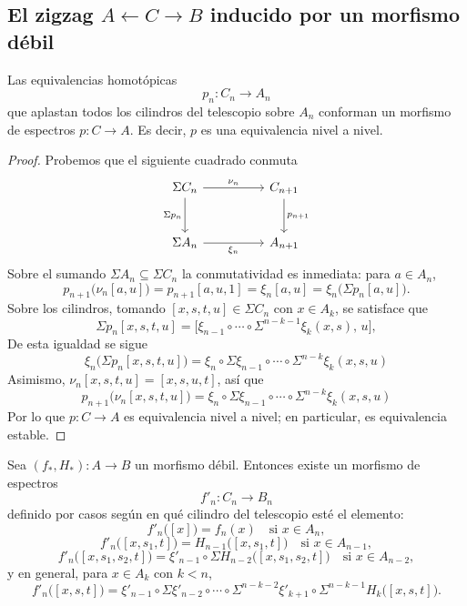 \subsection{El zigzag \texorpdfstring{$A \leftarrow C \to B$}{A <- C -> B} inducido por un morfismo débil}

\begin{prop}\label{prop:p-espectro}
Las equivalencias homotópicas
\[
p_n\colon C_n\longrightarrow A_n
\]
que aplastan todos los cilindros del telescopio sobre $A_n$ conforman un morfismo de espectros $p\colon C\to A$. Es decir, $p$ es una equivalencia nivel a nivel.
\end{prop}

\begin{proof}
Probemos que el siguiente cuadrado conmuta
\[
\begin{tikzcd}[column sep=huge, row sep=large]
\Sigma C_n \arrow[r,"\nu_n"] \arrow[d,"\Sigma p_n"'] & C_{n+1} \arrow[d,"p_{n+1}"]\\
\Sigma A_n \arrow[r,"\xi_n"'] & A_{n+1}
\end{tikzcd}
\]
Sobre el sumando $\Sigma A_n\subseteq\Sigma C_n$ la conmutatividad es inmediata: para $a\in A_n$,
\[
p_{n+1}\bigl(\nu_n[a,u]\bigr)
=p_{n+1}[a,u,1]
=\xi_n[a,u]
=\xi_n\bigl(\Sigma p_n[a,u]\bigr).
\]
Sobre los cilindros, tomando $[x,s,t,u]\in\Sigma C_n$ con $x\in A_k$, se satisface que
\[
\Sigma p_n[x,s,t,u]=\bigl[\xi_{n-1}\circ\cdots\circ\Sigma^{n-k-1}\xi_k(x,s),\,u\bigr],
\]
De esta igualdad se sigue
\[
\xi_n\bigl(\Sigma p_n[x,s,t,u]\bigr) = \xi_n\circ\Sigma\xi_{n-1}\circ\cdots\circ\Sigma^{n-k}\xi_k(x,s,u)
\]
Asimismo, $\nu_n[x,s,t,u] = [x,s,u,t]$, así que
\[
p_{n+1}\bigl(\nu_n[x,s,t,u]\bigr) = \xi_n\circ\Sigma\xi_{n-1}\circ\cdots\circ\Sigma^{n-k}\xi_k(x,s,u)
\]
Por lo que $p\colon C \to A$ es equivalencia nivel a nivel; en particular, es equivalencia estable.
\end{proof}



\begin{prop}\label{prop:fprima-espectro}
Sea $(f_*,H_*)\colon A\to B$ un morfismo débil. Entonces existe un morfismo de espectros
\[
f'_n\colon C_n\longrightarrow B_n
\]
definido por casos según en qué cilindro del telescopio esté el elemento:
\[
f'_n\bigl([x]\bigr)=f_n(x)\quad\text{si }x\in A_n,
\]
\[
f'_n\bigl([x,s_1,t]\bigr)=H_{n-1}\bigl([x,s_1,t]\bigr)\quad\text{si }x\in A_{n-1},
\]
\[
f'_n\bigl([x,s_1,s_2,t]\bigr)=\xi'_{n-1}\circ\Sigma H_{n-2}\bigl([x,s_1,s_2,t]\bigr)\quad\text{si }x\in A_{n-2},
\]
y en general, para $x\in A_{k}$ con $k< n$,
\[
f'_n\bigl([x,s,t]\bigr)=\xi'_{n-1}\circ\Sigma\xi'_{n-2}\circ\cdots\circ\Sigma^{n-k-2}\xi'_{k+1}\circ\Sigma^{n-k-1}H_{k}\bigl([x,s,t]\bigr).
\]
\end{prop}

